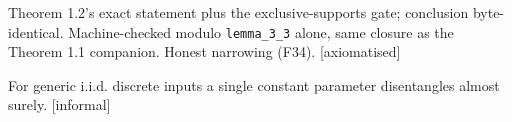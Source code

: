 \begin{theorem}\label{thm:12x}
Theorem 1.2's exact statement plus the exclusive-supports gate; conclusion byte-identical.
Machine-checked modulo \texttt{lemma\_3\_3} alone, same closure as the Theorem 1.1 companion.
Honest narrowing (F34). [axiomatised]
\end{theorem}

\begin{proposition}\label{prop:62}
For generic i.i.d. discrete inputs a single constant parameter disentangles almost surely. [informal]
\end{proposition}
